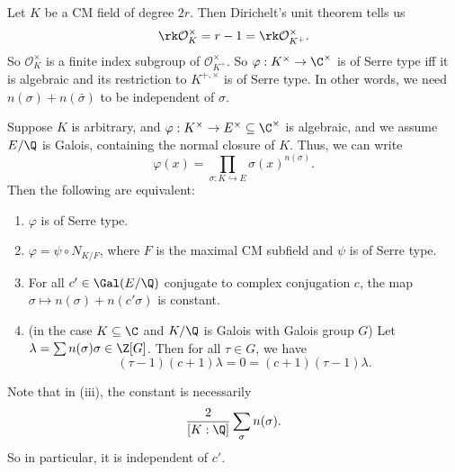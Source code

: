 \documentclass[a4paper]{article}
\begin{document}
\begin{eg}
  Let $K$ be a CM field of degree $2r$. Then Dirichelt's unit theorem tells us
  \[
    \rk \mathcal{O}_K^\times = r - 1 = \rk \mathcal{O}_{K^+}^\times.
  \]
  So $\mathcal{O}_K^\times$ is a finite index subgroup of $\mathcal{O}_{K^+}^\times$. So $\varphi: K^\times \to \C^\times$ is of Serre type iff it is algebraic and its restriction to $K^{+, \times}$ is of Serre type. In other words, we need $n(\sigma) + n(\bar{\sigma})$ to be independent of $\sigma$.
\end{eg}

\begin{thm}
  Suppose $K$ is arbitrary, and $\varphi: K^\times \to E^\times \subseteq \C^\times$ is algebraic, and we assume $E/\Q$ is Galois, containing the normal closure of $K$. Thus, we can write
  \[
    \varphi(x) = \prod_{\sigma: K \hookrightarrow E} \sigma(x)^{n(\sigma)}.
  \]
  Then the following are equivalent:
  \begin{enumerate}
    \item $\varphi$ is of Serre type.
    \item $\varphi = \psi \circ N_{K/F}$, where $F$ is the maximal CM subfield and $\psi$ is of Serre type.
    \item For all $c' \in \Gal(E/\Q)$ conjugate to complex conjugation $c$, the map $\sigma \mapsto n(\sigma) + n (c' \sigma)$ is constant.
    \item (in the case $K \subseteq \C$ and $K/\Q$ is Galois with Galois group $G$) Let $\lambda = \sum n(\sigma) \sigma \in \Z[G]$. Then for all $\tau \in G$, we have
      \[
        (\tau - 1)(c + 1) \lambda = 0 = (c + 1)(\tau - 1) \lambda.
      \]
  \end{enumerate}
\end{thm}
Note that in (iii), the constant is necessarily
\[
  \frac{2}{[K:\Q]} \sum_\sigma n(\sigma).
\]
So in particular, it is independent of $c'$.
\end{document}
